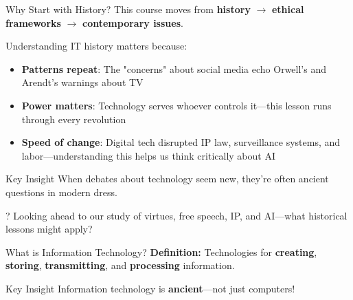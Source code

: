 \documentclass[aspectratio=169]{beamer}
\begin{document}
\begin{frame}{Why Start with History?}
This course moves from \textbf{history} $\rightarrow$ \textbf{ethical frameworks} $\rightarrow$ \textbf{contemporary issues}.

Understanding IT history matters because:
\begin{itemize}
    \item \textbf{Patterns repeat}: The "concerns" about social media echo Orwell's and Arendt's warnings about TV
    \item \textbf{Power matters}: Technology serves whoever controls it---this lesson runs through every revolution
    \item \textbf{Speed of change}: Digital tech disrupted IP law, surveillance systems, and labor---understanding this helps us think critically about AI
\end{itemize}

\vspace{0.2cm}
\begin{exampleblock}{Key Insight}
When debates about technology seem new, they're often ancient questions in modern dress.
\end{exampleblock}

\vspace{0.2cm}
\begin{alertblock}{?}
Looking ahead to our study of virtues, free speech, IP, and AI---what historical lessons might apply?
\end{alertblock}
\end{frame}

\begin{frame}{What is Information Technology?}
\textbf{Definition:} Technologies for \textbf{creating}, \textbf{storing}, \textbf{transmitting}, and \textbf{processing} information.

\vspace{0.5em}
\begin{block}{Key Insight}
Information technology is \textbf{ancient}---not just computers!
\end{block}

\vspace{0.3em}

\vspace{0.5em}
\end{frame}
\end{document}
